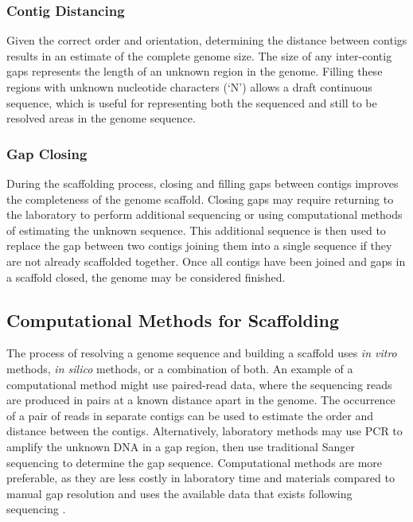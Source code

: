 \documentclass[10pt]{bmc_article}
\newenvironment{bmcformat}{\begin{raggedright}\baselineskip20pt\sloppy\setboolean{publ}{false}}{\end{raggedright}\baselineskip20pt\sloppy}
\begin{document}
\begin{bmcformat}
\subsubsection*{Contig Distancing} %

Given the correct order and orientation, determining the distance between
contigs results in an estimate of the complete genome size. The size of any
inter-contig gaps represents the length of an unknown region in the genome.
Filling these regions with unknown nucleotide characters (`N') allows a draft
continuous sequence, which is useful for representing both the sequenced and
still to be resolved areas in the genome sequence.

\subsubsection*{Gap Closing} %

During the scaffolding process, closing and filling gaps between contigs
improves the completeness of the genome scaffold. Closing gaps may require
returning to the laboratory to perform additional sequencing or using
computational methods of estimating the unknown sequence. This additional
sequence is then used to replace the gap between two contigs joining them into
a single sequence if they are not already scaffolded together. Once all contigs
have been joined and gaps in a scaffold closed, the genome may be considered
finished.

\subsection*{Computational Methods for Scaffolding} %

The process of resolving a genome sequence and building a scaffold uses
\emph{in vitro} methods, \emph{in silico} methods, or a combination of both. An
example of a computational method might use paired-read data, where the
sequencing reads are produced in pairs at a known distance apart in the genome.
The occurrence of a pair of reads in separate contigs can be used to estimate
the order and distance between the contigs. Alternatively, laboratory methods
may use PCR to amplify the unknown DNA in a gap region, then use traditional
Sanger sequencing to determine the gap sequence. Computational methods are more
preferable, as they are less costly in laboratory time and materials compared
to manual gap resolution and uses the available data that exists following
sequencing \cite{nagarajan2010}. \pb


\end{bmcformat}
\end{document}
